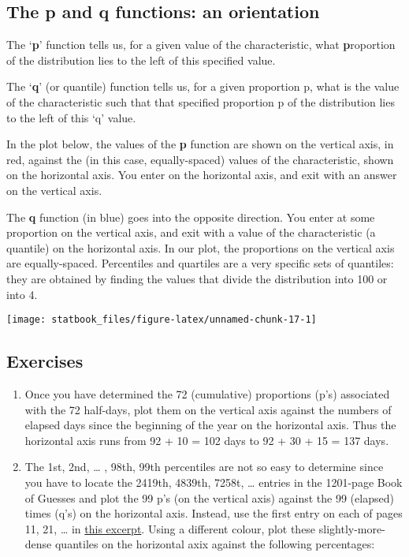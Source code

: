 \documentclass[]{book}
\begin{document}
\hypertarget{the-p-and-q-functions-an-orientation-1}{%
\subsection{The p and q functions: an orientation}\label{the-p-and-q-functions-an-orientation-1}}

The `\textbf{p}' function tells us, for a given value of the characteristic, what \textbf{p}roportion of the distribution lies to the left of this specified value.

The `\textbf{q}' (or quantile) function tells us, for a given proportion p, what is the value of the characteristic such that that specified proportion p of the distribution lies to the left of this `q' value.

In the plot below, the values of the \textbf{p} function are shown on the vertical axis, in red, against the (in this case, equally-spaced) values of the characteristic, shown on the horizontal axis. You enter on the horizontal axis, and exit with an answer on the vertical axis.

The \textbf{q} function (in blue) goes into the opposite direction. You enter at some proportion on the vertical axis, and exit with a value of the characteristic (a quantile) on the horizontal axis. In our plot, the proportions on the vertical axis are equally-spaced. Percentiles and quartiles are a very specific sets of quantiles: they are obtained by finding the values that divide the distribution into 100 or into 4.

\begin{center}\texttt{[image: statbook\_files/figure-latex/unnamed-chunk-17-1]} \end{center}

\hypertarget{exercises-3}{%
\subsection{Exercises}\label{exercises-3}}

\begin{enumerate}
\def\labelenumi{\arabic{enumi}.}
\item
  Once you have determined the 72 (cumulative) proportions (p's) associated with the 72 half-days, plot them on the vertical axis against the numbers of elapsed days since the beginning of the year on the horizontal axis. Thus the horizontal axis runs from 92 + 10 = 102 days to 92 + 30 + 15 = 137 days.
\item
  The 1st, 2nd, \ldots{} , 98th, 99th percentiles are not so easy to determine since you have to locate the 2419th, 4839th, 7258t, \ldots{} entries in the 1201-page Book of Guesses and plot the 99 p's (on the vertical axis) against the 99 (elapsed) times (q's) on the horizontal axis. Instead, use the first entry on each of pages 11, 21, \ldots{} in
  \href{http://www.biostat.mcgill.ca/hanley/bios691/SampledPages.pdf}{this excerpt}. Using a different colour, plot these slightly-more-dense quantiles on the horizontal axix against the following percentages:
\end{enumerate}
\end{document}
